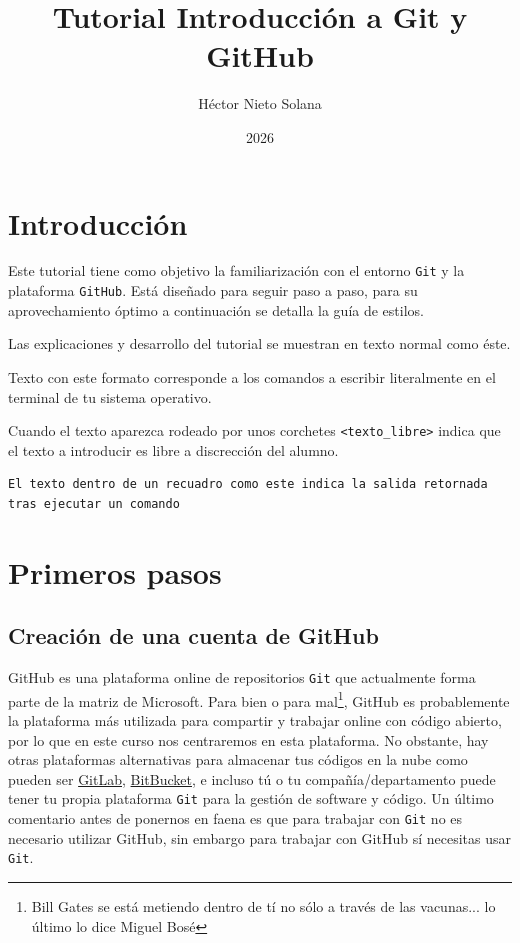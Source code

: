 \documentclass[a4paper,11pt]{report}
\title{Tutorial Introducción a Git y GitHub}
\author{Héctor Nieto Solana}
\date{2026}
\newcommand{\cverb}{\Verb}
\begin{document}
 \maketitle
 \tableofcontents

 \clearpage
 
 \chapter{Introducción}
 
  Este tutorial tiene como objetivo la familiarización con el entorno \verb+Git+ y la plataforma \verb+GitHub+. Está diseñado para seguir paso a paso, para su aprovechamiento óptimo a continuación se detalla la guía de estilos.
 
  Las explicaciones y desarrollo del tutorial se muestran en texto normal como éste.
 
  \begin{cverbatim}
Texto con este formato corresponde a los comandos a escribir
literalmente en el terminal de tu sistema operativo. 
  \end{cverbatim}

  Cuando el texto aparezca rodeado por unos corchetes \cverb+<texto_libre>+ indica que el texto a introducir es libre a discrección del alumno.
  
  \begin{lstlisting}[style=custom, caption=Ejemplo de salida retornada por un comando]
El texto dentro de un recuadro como este indica la salida retornada tras ejecutar un comando
  \end{lstlisting} 

 \clearpage

 \chapter{Primeros pasos}

  \section{Creación de una cuenta de GitHub}\label{sec:github_login}
    GitHub es una plataforma online de repositorios \verb+Git+ que actualmente forma parte de la matriz de Microsoft. Para bien o para mal\footnote{Bill Gates se está metiendo dentro de tí no sólo a través de las vacunas... lo último lo dice Miguel Bosé}, GitHub es probablemente la plataforma más utilizada para compartir y trabajar online con código abierto, por lo que en este curso nos centraremos en esta plataforma. No obstante, hay otras plataformas alternativas para almacenar tus códigos en la nube como pueden ser \href{https://about.gitlab.com}{GitLab}, \href{https://bitbucket.org}{BitBucket}, e incluso tú o tu compañía/departamento puede tener tu propia plataforma \verb+Git+ para la gestión de software y código. Un último comentario antes de ponernos en faena es que para trabajar con \verb+Git+ no es necesario utilizar GitHub, sin embargo para trabajar con GitHub sí necesitas usar \verb+Git+.
    
\end{document}
